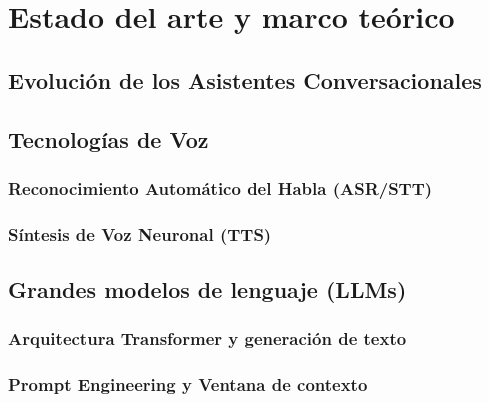 \chapter{\textbf{Estado del arte y marco teórico}}
\label{ch:EstadoArte}
\thispagestyle{fancy}

\section{Evolución de los Asistentes Conversacionales}
\label{sec:evolucion_asistentes}

\textoBase

\textoBaseAlt

\section{Tecnologías de Voz}
\label{sec:tecnologias_voz}

\textoBase

\subsection{Reconocimiento Automático del Habla (ASR/STT)}
\label{subsec:asr_stt}

\textoBaseAlt

\subsection{Síntesis de Voz Neuronal (TTS)}
\label{subsec:tts_neuronal}

\textoBase

\section{Grandes modelos de lenguaje (LLMs)}
\label{sec:llms}

\textoBase

\subsection{Arquitectura Transformer y generación de texto}
\label{subsec:transformer_generacion}

\textoBaseAlt

\subsection{Prompt Engineering y Ventana de contexto}
\label{subsec:prompt_engineering}

